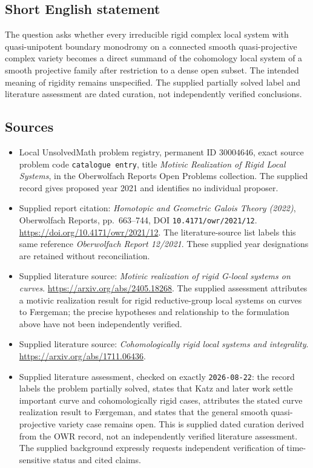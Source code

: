 \documentclass[11pt]{article}
\begin{document}
\subsection{Short English statement}
The question asks whether every irreducible rigid complex local system with quasi-unipotent boundary monodromy on a connected smooth quasi-projective complex variety becomes a direct summand of the cohomology local system of a smooth projective family after restriction to a dense open subset. The intended meaning of rigidity remains unspecified. The supplied partially solved label and literature assessment are dated curation, not independently verified conclusions.
\subsection{Sources}
\begin{itemize}
\item Local UnsolvedMath problem registry, permanent ID \(30004646\), exact source problem code \texttt{catalogue entry}, title \emph{Motivic Realization of Rigid Local Systems}, in the Oberwolfach Reports Open Problems collection. The supplied record gives proposed year 2021 and identifies no individual proposer.
\item Supplied report citation: \emph{Homotopic and Geometric Galois Theory (2022)}, Oberwolfach Reports, pp.\ 663--744, DOI \texttt{10.4171/owr/2021/12}. \url{https://doi.org/10.4171/owr/2021/12}. The literature-source list labels this same reference \emph{Oberwolfach Report 12/2021}. These supplied year designations are retained without reconciliation.
\item Supplied literature source: \emph{Motivic realization of rigid G-local systems on curves}. \url{https://arxiv.org/abs/2405.18268}. The supplied assessment attributes a motivic realization result for rigid reductive-group local systems on curves to F\ae rgeman; the precise hypotheses and relationship to the formulation above have not been independently verified.
\item Supplied literature source: \emph{Cohomologically rigid local systems and integrality}. \url{https://arxiv.org/abs/1711.06436}.
\item Supplied literature assessment, checked on exactly \texttt{2026-08-22}: the record labels the problem partially solved, states that Katz and later work settle important curve and cohomologically rigid cases, attributes the stated curve realization result to F\ae rgeman, and states that the general smooth quasi-projective variety case remains open. This is supplied dated curation derived from the OWR record, not an independently verified literature assessment. The supplied background expressly requests independent verification of time-sensitive status and cited claims.
\end{itemize}
\end{document}
